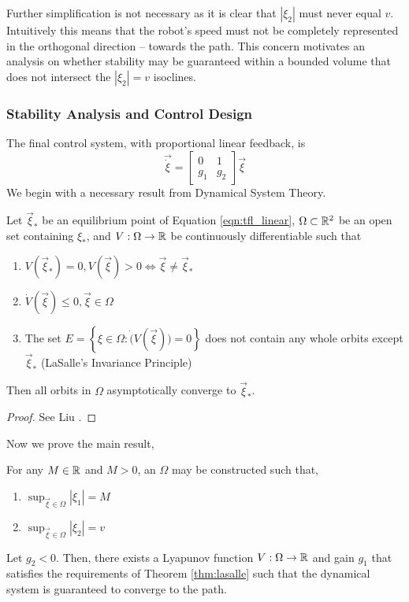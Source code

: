 \documentclass[oneside, 11pt]{book}
\begin{document}
Further simplification is not necessary as it is clear that $\left|\xi_2\right|$ must never equal $v$. Intuitively this means that the robot's speed must not be completely represented in the orthogonal direction -- towards the path. This concern motivates an analysis on whether stability may be guaranteed within a bounded volume that does not intersect the $\left|\xi_2\right|=v$ isoclines.

\subsubsection{Stability Analysis and Control Design}
The final control system, with proportional linear feedback, is
\begin{equation}
    \vec{\dot{\xi}} =   \begin{bmatrix}
                            0 & 1 \\
                            g_1 & g_2
                        \end{bmatrix}
                        \vec{\xi}
    \label{eqn:tfl_linear}
\end{equation}
We begin with a necessary result from Dynamical System Theory.
\begin{theorem}
    Let $\vec{\xi}_*$ be an equilibrium point of Equation \ref{eqn:tfl_linear}, $\Omega\subset\mathbb{R}^2$ be an open set containing $\xi_*$, and $V:\Omega\to\mathbb{R}$ be continuously differentiable such that
    \begin{enumerate}
        \item $V(\vec{\xi}_*) = 0, V(\vec{\xi}) > 0 \Leftrightarrow \vec{\xi}\neq\vec{\xi}_*$
        \item $\dot{V}(\vec{\xi})\leq 0, \vec{\xi}\in\Omega$
        \item The set $E = \left\{ \xi \in \Omega : \dot(V(\vec{\xi})) = 0 \right\}$ does not contain any whole orbits except $\vec{\xi}_*$ (LaSalle's Invariance Principle)
    \end{enumerate}
    Then all orbits in $\Omega$ asymptotically converge to $\vec{\xi}_*$.
    \label{thm:lasalle}
\end{theorem}
\begin{proof}
    See Liu \cite{Liu12}.
\end{proof}
Now we prove the main result,
\begin{theorem}
    For any $M\in\mathbb{R}$ and $M>0$, an $\Omega$ may be constructed such that,
    \begin{enumerate}
        \item $\sup_{\vec{\xi}\in\Omega}{\left|\xi_1\right|} = M$
        \item $\sup_{\vec{\xi}\in\Omega}{\left|\xi_2\right|} = v$
    \end{enumerate}
    Let $g_2 < 0$. Then, there exists a Lyapunov function $V:\Omega\to\mathbb{R}$ and gain $g_1$ that satisfies the requirements of Theorem \ref{thm:lasalle} such that the dynamical system is guaranteed to converge to the path.
\end{theorem}
\end{document}
